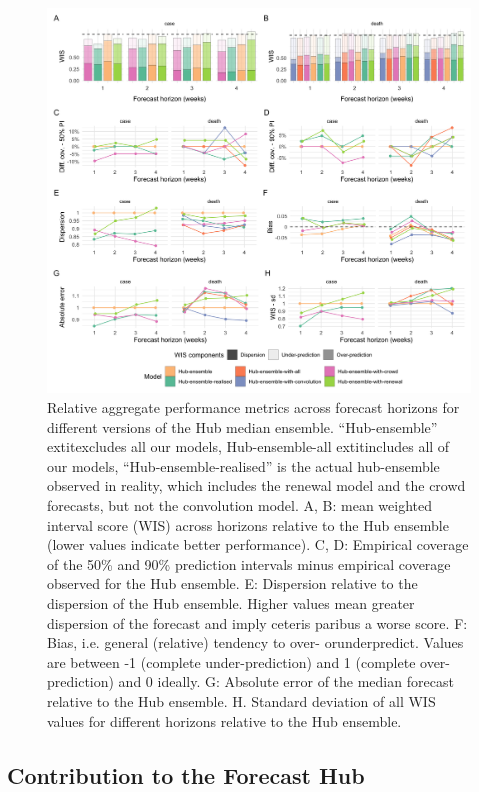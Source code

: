 \documentclass[10pt,letterpaper]{article}
\begin{document}
\begin{figure}[H]
\includegraphics[width=1\linewidth,]{../analysis/plots/aggregate-performance-rel-ensemble-v4} \caption{Relative aggregate performance metrics across forecast horizons for different versions of the Hub median ensemble. “Hub-ensemble”    extit{excludes} all our models, Hub-ensemble-all    extit{includes} all of our models, “Hub-ensemble-realised” is the actual hub-ensemble observed in reality, which includes the renewal model and the crowd forecasts, but not the convolution model. A, B: mean weighted interval score (WIS) across horizons relative to the Hub ensemble (lower values indicate better performance). C, D: Empirical coverage of the 50\% and 90\% prediction intervals minus empirical coverage observed for the Hub ensemble. E: Dispersion relative to the dispersion of the Hub ensemble. Higher values mean greater dispersion of the forecast and imply ceteris paribus a worse score. F: Bias, i.e. general (relative) tendency to over- orunderpredict. Values are between -1 (complete under-prediction) and 1 (complete over-prediction) and 0 ideally. G: Absolute error of the median forecast relative to the Hub ensemble. H. Standard deviation of all WIS values for different horizons relative to the Hub ensemble.}\label{fig:agg-performance-ensemble-rel}
\end{figure}

\hypertarget{contributions-hub}{%
\subsection{Contribution to the Forecast Hub}\label{contributions-hub}}
\end{document}
